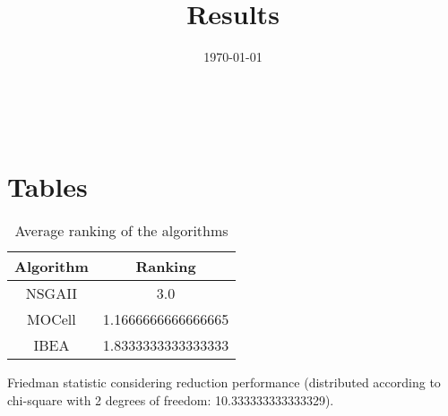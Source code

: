 \documentclass{article}
\title{Results}
\author{}
\date{\today}
\begin{document}
\oddsidemargin 0in \topmargin 0in\maketitle
\
\section{Tables}
\begin{table}[!htp]
\centering
\caption{Average ranking of the algorithms}
\begin{tabular}{c|c}
Algorithm&Ranking\\
\hline
NSGAII&3.0\\
MOCell&1.1666666666666665\\
IBEA&1.8333333333333333\\
\end{tabular}
\end{table}


Friedman statistic considering reduction performance (distributed according to chi-square with 2 degrees of freedom: 10.333333333333329).
\end{document}
